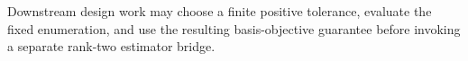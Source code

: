 Downstream design work may choose a finite positive tolerance, evaluate the fixed enumeration, and use the resulting basis-objective guarantee before invoking a separate rank-two estimator bridge.